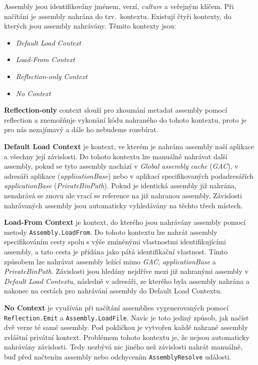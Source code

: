 Assembly jsou identifikovány jménem, verzí, \textit{culture} a veřejným klíčem. 
Při načítání je assembly nahrána do tzv.~kontextu. Existují čtyři kontexty, do kterých jsou assembly nahrávány. Těmito kontexty jsou\citep{site:assemblyload}:
\begin{itemize}
	\item \textit{Default Load Context}
	\item \textit{Load-From Context}
	\item \textit{Reflection-only Context}
	\item \textit{No Context}
\end{itemize}

\textbf{Reflection-only} context slouží pro zkoumání metadat assembly pomocí reflection a znemožňuje vykonání kódu nahraného do tohoto kontextu, proto je pro nás nezajímavý a dále ho nebudeme rozebírat.

\textbf{Default Load Context} je kontext, ve kterém je nahrána assembly naší aplikace a všechny její závislosti. Do tohoto kontextu lze manuálně nahrávat další assembly, pokud se tyto assembly nachází v \textit{Global assembly cache} (\emph{GAC}), v adresáři aplikace (\textit{applicationBase}) nebo v aplikací specifikovaných podadresářích \textit{applicationBase} (\textit{PrivateBinPath}). Pokud je identická assembly již nahrána, nenahrává se znovu ale vrací se reference na již nahranou assembly. Závislosti nahrávaných assembly jsou automaticky vyhledávány na těchto třech místech.

\textbf{Load-From Context} je kontext, do kterého jsou nahrávány assembly pomocí metody \texttt{Assembly.LoadFrom}. Do tohoto kontextu lze nahrát assembly specifikováním cesty spolu s výše zmíněnými vlastnostmi identifikujícími assembly, a tato cesta je přidána jako pátá identifikační vlastnost. Tímto způsobem lze nahrávat assembly ležící mimo \emph{GAC}, \textit{applicationBase} a \textit{PrivateBinPath}. Závislosti jsou hledány nejdříve mezi již nahranými assembly v \textit{Default Load Contextu}, následně v adresáři, ze kterého byla assembly nahrána a nakonec na cestách pro nahrávání assembly do Default Load Contextu.

\textbf{No Context} je využíván při načítání  assemblies vygenerovaných pomocí \texttt{Reflection.Emit} a \texttt{Assembly.LoadFile}. Navíc je toto jediný způsob, jak načíst dvě verze té samé assembly. Pod pokličkou je vytvořen každé nahrané assembly zvláštní privátní kontext. Problémem tohoto kontextu je, že nejsou automaticky nahrávány závislosti. Tedy nezbývá nic jiného než závislosti nahrát manuálně, buď před načtením assembly nebo odchycením \texttt{AssemblyResolve} události.


